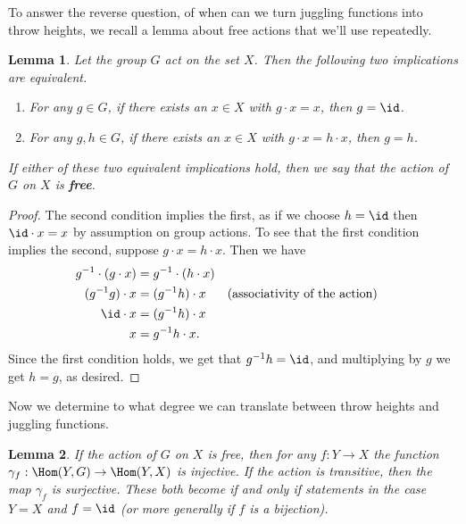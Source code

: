 \documentclass[12nt]{article}
\theoremstyle{plain}
\newtheorem{lemma}{Lemma}
\begin{document}
To answer the reverse question, of when can we turn juggling functions into throw heights, we recall a lemma about free actions that we'll use repeatedly.

\begin{lemma}
Let the group $G$ act on the set $X$. Then the following two implications are equivalent.
\begin{enumerate}
\item
For any $g \in G$, if there exists an $x \in X$ with $g \cdot x = x$, then $g = \id$.
\item
For any $g, h \in G$, if there exists an $x \in X$ with $g \cdot x = h \cdot x$, then $g = h$.
\end{enumerate}
If either of these two equivalent implications hold, then we say that the action of $G$ on $X$ is \textbf{free}.
\end{lemma}

\begin{proof}
The second condition implies the first, as if we choose $h = \id$ then $\id \cdot x = x$ by assumption on group actions. To see that the first condition implies the second, suppose $g \cdot x = h \cdot x$. Then we have 
\begin{align*}
g^{-1} \cdot (g \cdot x) &= g^{-1} \cdot (h \cdot x) \\
(g^{-1}g) \cdot x &= (g^{-1}h) \cdot x && \text{(associativity of the action)} \\
\id \cdot x &= (g^{-1}h) \cdot x \\
x &= g^{-1}h \cdot x.
\end{align*}
Since the first condition holds, we get that $g^{-1}h = \id$, and multiplying by $g$ we get $h = g$, as desired.
\end{proof}

Now we determine to what degree we can translate between throw heights and juggling functions.

\begin{lemma}
If the action of $G$ on $X$ is free, then for any $f : Y \to X$ the function $\gamma_f : \Hom(Y, G) \to \Hom(Y, X)$ is injective. If the action is transitive, then the map $\gamma_f$ is surjective. These both become if and only if statements in the case $Y = X$ and $f = \id$ (or more generally if $f$ is a bijection).
\end{lemma}
\end{document}
